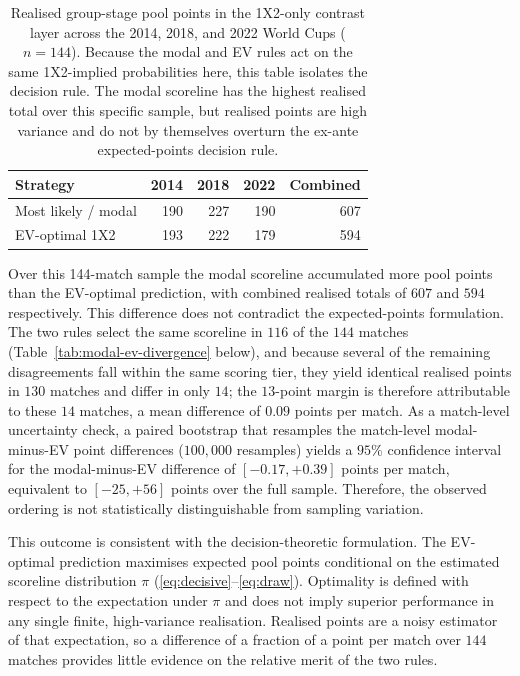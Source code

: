 \documentclass[11pt]{article}
\begin{document}
\begin{table}[htbp]
\centering
\small
\begin{tabular}{lrrrr}
\toprule
Strategy & 2014 & 2018 & 2022 & Combined \\
\midrule
Most likely / modal          & 190 & 227 & 190 & 607 \\
EV-optimal 1X2               & 193 & 222 & 179 & 594 \\
\bottomrule
\end{tabular}
\caption{Realised group-stage pool points in the 1X2-only contrast layer across
the 2014, 2018, and 2022 World Cups (\(n=144\)). Because the modal and EV rules act on the same
1X2-implied probabilities here, this table isolates the decision rule. The modal scoreline has
the highest realised total over this specific sample, but realised points are high variance and
do not by themselves overturn the ex-ante expected-points decision rule.}
\label{tab:results}
\end{table}
\clearpage
Over this 144-match sample the modal scoreline accumulated more pool points than the EV-optimal
prediction, with combined realised totals of $607$ and $594$ respectively. This difference does
not contradict the expected-points formulation. The two rules select the same scoreline in $116$
of the $144$ matches (Table~\ref{tab:modal-ev-divergence} below), and because several of the remaining
disagreements fall within the same scoring tier, they yield identical realised points in $130$
matches and differ in only $14$; the $13$-point margin is therefore attributable to these $14$
matches, a mean difference of $0.09$ points per match. As a match-level uncertainty check, a paired bootstrap that resamples the match-level modal-minus-EV point differences ($100{,}000$ resamples) yields a $95\%$ confidence
interval for the modal-minus-EV difference of $[-0.17, +0.39]$ points per match, equivalent to
$[-25, +56]$ points over the full sample. Therefore, the observed ordering is not statistically distinguishable
from sampling variation.

This outcome is consistent with the decision-theoretic formulation. The EV-optimal prediction maximises expected pool points conditional on the estimated scoreline distribution $\pi$ (\eqref{eq:decisive}--\eqref{eq:draw}). Optimality is defined with respect to the expectation under $\pi$ and does not imply superior performance in any single finite, high-variance realisation. Realised points are a noisy estimator of that expectation, so a difference of a fraction of a point per match over $144$ matches provides little evidence on the relative merit of the two rules.
\end{document}
